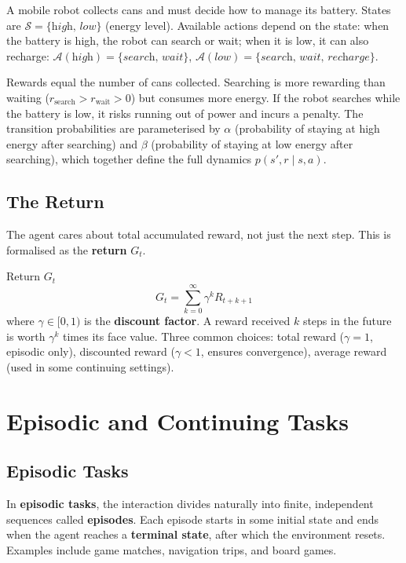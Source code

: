 \documentclass[11pt,a4paper]{article}
\newcommand{\term}[1]{\textcolor{DefGreen}{\textbf{#1}}}
\begin{document}
A mobile robot collects cans and must decide how to manage its battery. States are $\mathcal{S} = \{\textit{high},\,\textit{low}\}$ (energy level). Available actions depend on the state: when the battery is high, the robot can search or wait; when it is low, it can also recharge: $\mathcal{A}(\textit{high}) = \{\textit{search},\,\textit{wait}\}$, $\mathcal{A}(\textit{low}) = \{\textit{search},\,\textit{wait},\,\textit{recharge}\}$.

Rewards equal the number of cans collected. Searching is more rewarding than waiting ($r_{\text{search}} > r_{\text{wait}} > 0$) but consumes more energy. If the robot searches while the battery is low, it risks running out of power and incurs a penalty. The transition probabilities are parameterised by $\alpha$ (probability of staying at high energy after searching) and $\beta$ (probability of staying at low energy after searching), which together define the full dynamics $p(s',r\mid s,a)$.

\subsection{The Return}

The agent cares about total accumulated reward, not just the next step. This is formalised as the \term{return} $G_t$.

\begin{defbox}{Return $G_t$}
\[
G_t = \sum_{k=0}^{\infty} \gamma^k R_{t+k+1}
\]
where $\gamma \in [0,1)$ is the \term{discount factor}. A reward received $k$ steps in the future is worth $\gamma^k$ times its face value. Three common choices: total reward ($\gamma=1$, episodic only), discounted reward ($\gamma<1$, ensures convergence), average reward (used in some continuing settings).
\end{defbox}

\section{Episodic and Continuing Tasks}

\subsection{Episodic Tasks}

In \term{episodic tasks}, the interaction divides naturally into finite, independent sequences called \term{episodes}. Each episode starts in some initial state and ends when the agent reaches a \term{terminal state}, after which the environment resets. Examples include game matches, navigation trips, and board games.
\end{document}
